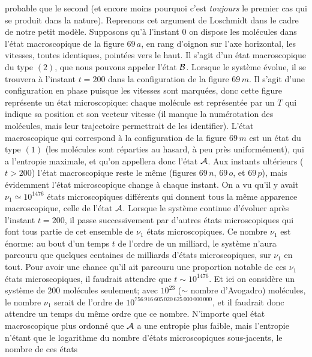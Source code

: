 probable que le second (et encore moins pourquoi c'est {\it toujours} 
le premier cas qui se produit dans la nature).
\medskip
Reprenons cet argument de Loschmidt dans le cadre de notre petit mod\`ele. 
Supposons qu'\`a l'instant $0$ on dispose les mol\'ecules dans  l'\'etat 
macroscopique de la figure $69\, a$, en rang d'oignon sur l'axe horizontal,
les vitesses, toutes identiques, point\'ees vers le haut. Il s'agit d'un 
\'etat macroscopique du type $(2)$, que nous pouvons appeler l'\'etat 
${\cal B}$. Lorsque le sys\-t\`eme \'evolue, il se trouvera \`a l'instant 
$t=200$ dans la configuration de la fi\-gu\-re $69\, m$. Il s'agit d'une
configuration en phase puisque les vitesses sont marqu\'ees, donc 
cette figure repr\'esente 
un \'etat microscopique: chaque mol\'ecule est repr\'esent\'ee par 
un $T$ qui indique sa position et son vecteur vitesse (il manque 
la num\'erotation des mol\'ecules, mais leur trajectoire per\-met\-trait 
de les identifier). L'\'etat macroscopique qui correspond \`a la 
con\-fi\-gu\-ra\-tion de la figure $69\, m$ est un \'etat du type $(1)$ (les 
mol\'ecules sont r\'e\-par\-ties au hasard, \`a peu pr\`es uniform\'ement), 
qui a l'entropie maximale, et qu'on ap\-pel\-lera donc l'\'etat ${\cal A}$.
Aux instants ult\'erieurs ($t > 200$) l'\'etat macroscopique reste le 
m\^eme (figures $69\, n$, $69\, o$, et $69\, p$), mais \'evidemment 
l'\'etat microscopique change \`a chaque instant. On 
a vu qu'il y avait $\nu_1 \simeq 10^{1476}$ \'etats
microscopiques diff\'erents qui donnent tous la m\^eme apparence 
macroscopique, celle de l'\'etat ${\cal A}$. Lorsque le syst\`eme continue 
d'\'evoluer apr\`es l'instant $t=200$, il passe successivement par d'autres 
\'etats microscopiques qui font tous partie de cet ensemble de $\nu_1$ 
\'etats microscopiques. Ce nombre $\nu_1$ est \'enorme: au bout d'un 
temps $t$ de l'ordre de un milliard, le syst\`eme n'aura parcouru que 
quelques centaines de milliards d'\'etats microscopiques, sur $\nu_1$ en 
tout. Pour avoir une chance qu'il ait parcouru une proportion notable 
de ces $\nu_1$ \'etats microscopiques, il faudrait 
attendre que $t \sim 10^{1476}$. Et ici on consid\`ere un syst\`eme
de $200$ mol\'ecules seulement; avec $10^{23}$ ($\sim$ nombre d'Avogadro) 
mol\'ecules, le nombre $\nu_1$ serait de l'ordre de 
$10^{756\, 916\, 605\, 020\, 625\, 000\, 000\, 000}$, et il faudrait 
donc attendre un temps du m\^eme ordre que ce nombre.
\medskip
N'importe quel \'etat macroscopique plus ordonn\'e que ${\cal A}$ a une 
entropie plus faible, mais l'entropie n'\'etant que le logarithme du 
nombre d'\'etats microscopiques sous-jacents, le nombre de ces \'etats 
